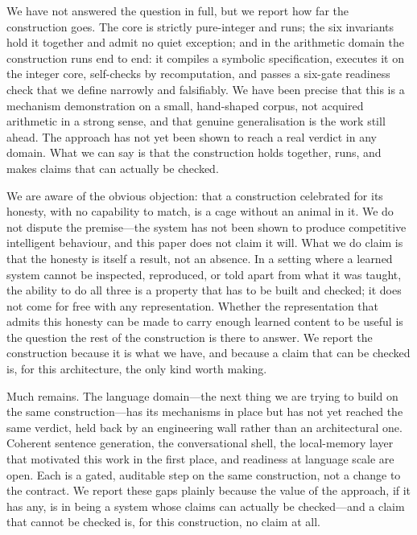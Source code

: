 \documentclass[11pt,a4paper]{article}
\begin{document}
We have not answered the question in full, but we report how far the
construction goes. The core is strictly pure-integer and runs; the six
invariants hold it together and admit no quiet exception; and in the
arithmetic domain the construction runs end to end: it compiles a
symbolic specification, executes it on the integer core, self-checks by
recomputation, and passes a six-gate readiness check that we define
narrowly and falsifiably. We have been precise that this is a mechanism
demonstration on a small, hand-shaped corpus, not acquired arithmetic in
a strong sense, and that genuine generalisation is the work still ahead.
The approach has not yet been shown to reach a real verdict in any
domain. What we can say is that the construction holds together, runs,
and makes claims that can actually be checked.

We are aware of the obvious objection: that a construction celebrated for
its honesty, with no capability to match, is a cage without an animal in
it. We do not dispute the premise---the system has not been shown to
produce competitive intelligent behaviour, and this paper does not claim
it will. What we do claim is that the honesty is itself a result, not an
absence. In a setting where a learned system cannot be inspected,
reproduced, or told apart from what it was taught, the ability to do all
three is a property that has to be built and checked; it does not come
for free with any representation. Whether the representation that admits
this honesty can be made to carry enough learned content to be useful is
the question the rest of the construction is there to answer. We report
the construction because it is what we have, and because a claim that can
be checked is, for this architecture, the only kind worth making.

Much remains. The language domain---the next thing we are trying to
build on the same construction---has its mechanisms in place but has not
yet reached the same verdict, held back by an engineering wall rather
than an architectural one. Coherent sentence generation, the
conversational shell, the local-memory layer that motivated this work in
the first place, and readiness at language scale are open. Each is a
gated, auditable step on the same construction, not a change to the
contract. We report these gaps plainly because the value of the
approach, if it has any, is in being a system whose claims can actually
be checked---and a claim that cannot be checked is, for this
construction, no claim at all.

\appendix
\end{document}
